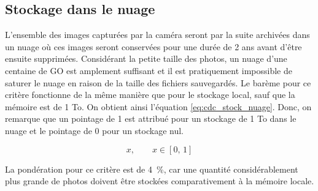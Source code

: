 

\subsection{Stockage dans le nuage}
\label{s:cdc_stock_nuage}

L’ensemble des images capturées par la caméra seront par la suite archivées dans un nuage où ces images seront conservées pour une durée de 2 ans avant d’être ensuite supprimées. Considérant la petite taille des photos, un nuage d’une centaine de GO est amplement suffisant et il est pratiquement impossible de saturer le nuage en raison de la taille des fichiers sauvegardés. Le barème pour ce critère fonctionne de la même manière que pour le stockage local, sauf que la mémoire est de 1 To. On obtient ainsi l’équation \ref{eq:cdc_stock_nuage}. Donc, on remarque que un pointage de 1 est attribué pour un stockage de 1 To dans le nuage et le pointage de 0 pour un stockage nul.

\begin{equation} \label{eq:cdc_stock_nuage}
	x, \qquad x \in [0,\,1]
\end{equation}


La pondération pour ce critère est de 4~\%, car une quantité considérablement plus grande de photos doivent être stockées comparativement à la mémoire locale.
